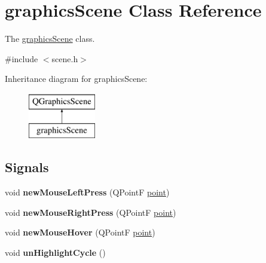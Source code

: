 \hypertarget{classgraphics_scene}{}\section{graphics\+Scene Class Reference}
\label{classgraphics_scene}


The \mbox{\hyperlink{classgraphics_scene}{graphics\+Scene}} class.  




{\ttfamily \#include $<$scene.\+h$>$}

Inheritance diagram for graphics\+Scene\+:\begin{figure}[H]
\begin{center}
\leavevmode
\includegraphics[height=2.000000cm]{classgraphics_scene}
\end{center}
\end{figure}
\subsection*{Signals}
\begin{DoxyCompactItemize}
\item 
\mbox{\label{classgraphics_scene_a370117524f759425873aa2dd710958c0}} 
void {\bfseries new\+Mouse\+Left\+Press} (Q\+PointF \mbox{\hyperlink{classpoint}{point}})
\item 
\mbox{\label{classgraphics_scene_a788bb2305e72c0deb7cd95a7e245b79a}} 
void {\bfseries new\+Mouse\+Right\+Press} (Q\+PointF \mbox{\hyperlink{classpoint}{point}})
\item 
\mbox{\label{classgraphics_scene_ad79f731b826d93f3c84d55f8d411666c}} 
void {\bfseries new\+Mouse\+Hover} (Q\+PointF \mbox{\hyperlink{classpoint}{point}})
\item 
\mbox{\label{classgraphics_scene_ab5dc117c8417d256b4cb9a01cbcd9509}} 
void {\bfseries un\+Highlight\+Cycle} ()
\end{DoxyCompactItemize}

